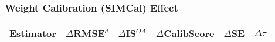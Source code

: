 \subsubsection{Weight Calibration (SIMCal) Effect}
\begin{tabular}{l|ccccc}
\toprule
Estimator & $\Delta$RMSE$^d$ & $\Delta$IS$^{OA}$ & $\Delta$CalibScore & $\Delta$SE & $\Delta\tau$ \\
\midrule
\bottomrule
\end{tabular}